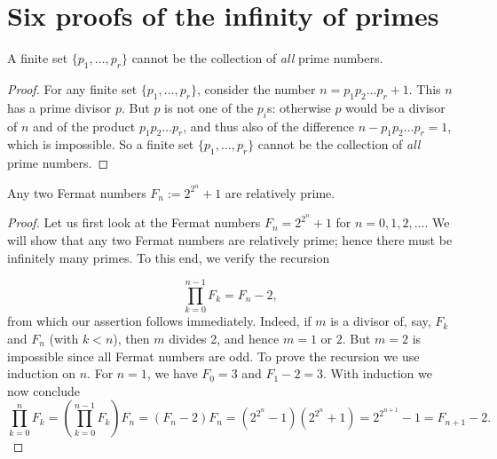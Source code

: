 \chapter{Six proofs of the infinity of primes}

\begin{theorem}
    \label{thm:eulids_proof}
    \leanok
    A finite set $\{p_1, \dots, p_r\}$ cannot be the collection of
    \emph{all} prime numbers.
\end{theorem}
\begin{proof}
    \leanok
    For any finite set $\{p_1, \dots, p_r\}$, consider the number
    $n = p_1p_2\dots p_r + 1$. This $n$ has a prime divisor $p$.
    But $p$ is not one of the $p_i$s: otherwise $p$ would be a divisor of $n$ and of the product
    $p_1p_2\dots p_r$, and thus also of the difference $n - p_1p_2\dots p_r = 1$,
    which is impossible. So a finite set $\{p_1, \dots, p_r\}$ cannot be the collection of
    \emph{all} prime numbers.
\end{proof}


\begin{theorem}
    \label{thm:second_proof}
    \leanok
    Any two Fermat numbers $F_n := 2^{2^n} + 1$ are relatively prime.
\end{theorem}
\begin{proof}
    \leanok
    Let us first look at the Fermat numbers \(F_n = 2^{2^n} +1\) for \(n = 0,1,2,\dots\).
    We will show that any two Fermat numbers are relatively prime;
    hence there must be infinitely many primes. To this end, we verify the recursion

    \[
    \prod_{k=0}^{n-1} F_k = F_n - 2,
    \]
    from which our assertion follows immediately.
    Indeed, if \(m\) is a divisor of, say,
    \(F_k\) and \(F_n\) (with \(k < n\)), then \(m\) divides 2, and hence \(m = 1\) or \(2\).
    But \(m = 2\) is impossible since all Fermat numbers are odd.
    To prove the recursion we use induction on \(n\).
    For \(n = 1\), we have \(F_0 = 3\) and \(F_1 - 2 = 3\).
    With induction we now conclude
    \[
    \prod_{k=0}^{n} F_k = \left( \prod_{k=0}^{n-1} F_k \right) F_n =
        (F_n - 2)F_n = (2^{2^n} - 1)(2^{2^n} + 1) = 2^{2^{n+1}} - 1 = F_{n+1} - 2.
    \]
\end{proof}

